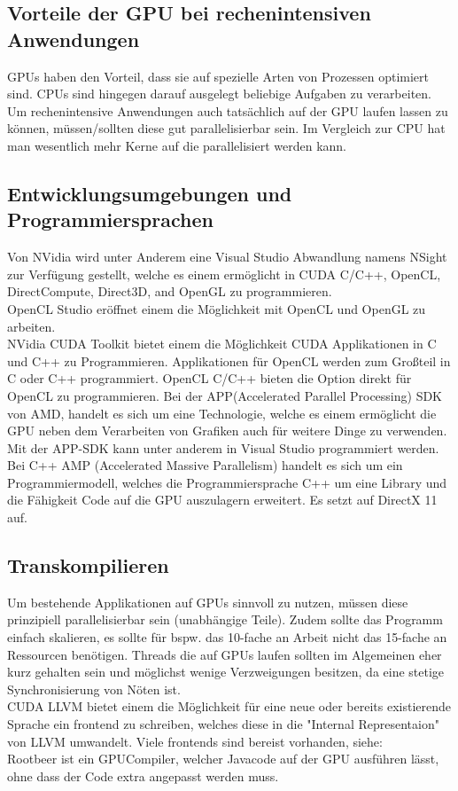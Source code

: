 \subsection{Vorteile der GPU bei rechenintensiven Anwendungen}
\label{sec:Vorteile der GPU bei rechenintensiven Anwendungen}
GPUs haben den Vorteil, dass sie auf spezielle Arten von Prozessen optimiert sind. CPUs sind hingegen darauf ausgelegt beliebige Aufgaben zu verarbeiten. Um rechenintensive Anwendungen auch tatsächlich auf der GPU laufen lassen zu können, müssen/sollten diese gut parallelisierbar sein. 
Im Vergleich zur CPU hat man wesentlich mehr Kerne auf die parallelisiert werden kann.

\subsection{Entwicklungsumgebungen und Programmiersprachen}
Von NVidia wird unter Anderem eine Visual Studio Abwandlung namens NSight zur Verfügung gestellt, welche es einem ermöglicht in CUDA C/C++, OpenCL, DirectCompute, Direct3D, and OpenGL zu programmieren.\\
OpenCL Studio eröffnet einem die Möglichkeit mit OpenCL und OpenGL zu arbeiten.\\
NVidia CUDA Toolkit bietet einem die Möglichkeit CUDA Applikationen in C und C++ zu Programmieren.
Applikationen für OpenCL werden zum Großteil in C oder C++ programmiert. OpenCL C/C++ bieten die Option direkt für OpenCL zu programmieren.
Bei der APP(Accelerated Parallel Processing) SDK von AMD, handelt es sich um eine Technologie, welche es einem ermöglicht die GPU neben dem Verarbeiten von Grafiken auch für weitere Dinge zu verwenden. Mit der APP-SDK kann unter anderem in Visual Studio programmiert werden. \cite{appsdk}\\
Bei C++ AMP (Accelerated Massive Parallelism) handelt es sich um ein Programmiermodell, welches die Programmiersprache C++  um eine Library und die Fähigkeit Code auf die GPU auszulagern erweitert.
Es setzt auf DirectX 11 auf. \cite{AMP}
\subsection{Transkompilieren}
Um bestehende Applikationen auf GPUs sinnvoll zu nutzen, müssen diese prinzipiell parallelisierbar sein (unabhängige Teile). Zudem sollte das Programm einfach skalieren, es sollte für bspw. das 10-fache an Arbeit nicht das 15-fache an Ressourcen benötigen.
Threads die auf GPUs laufen sollten im Algemeinen eher kurz gehalten sein und möglichst wenige Verzweigungen besitzen, da eine stetige Synchronisierung von Nöten ist. \cite{GPUGrundlagen}\\
CUDA LLVM bietet einem die Möglichkeit für eine neue oder bereits existierende Sprache ein frontend zu schreiben, welches diese in die "Internal Representaion" von LLVM umwandelt. Viele frontends sind bereist vorhanden, siehe: \cite{llvm} \cite{llvmfrontend} \\
Rootbeer ist ein GPUCompiler, welcher Javacode auf der GPU ausführen lässt, ohne dass der Code extra angepasst werden muss.\cite{Rootbeer}

